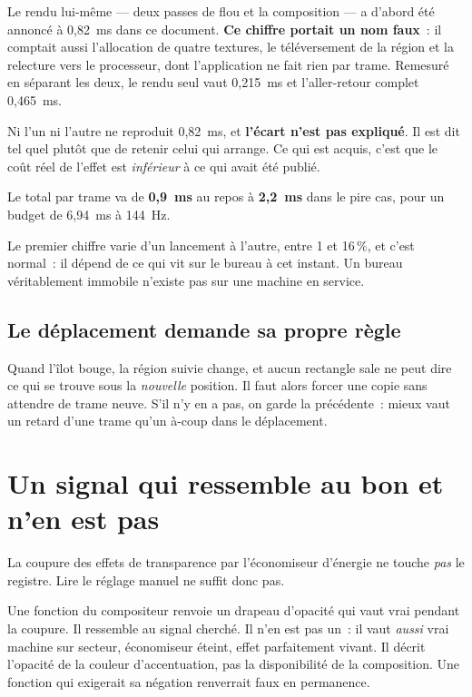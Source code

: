 \documentclass[11pt,a4paper]{article}
\newcommand{\np}[1]{#1}
\begin{document}
Le rendu lui-même — deux passes de flou et la composition — a d'abord été
annoncé à \np{0,82}~ms dans ce document. \textbf{Ce chiffre portait un nom
faux}~: il comptait aussi l'allocation de quatre textures, le téléversement de
la région et la relecture vers le processeur, dont l'application ne fait rien
par trame. Remesuré en séparant les deux, le rendu seul vaut \np{0,215}~ms et
l'aller-retour complet \np{0,465}~ms.

Ni l'un ni l'autre ne reproduit \np{0,82}~ms, et \textbf{l'écart n'est pas
expliqué}. Il est dit tel quel plutôt que de retenir celui qui arrange. Ce qui
est acquis, c'est que le coût réel de l'effet est \emph{inférieur} à ce qui
avait été publié.

Le total par trame va de \textbf{\np{0,9}~ms} au repos à \textbf{\np{2,2}~ms}
dans le pire cas, pour un budget de \np{6,94}~ms à 144~Hz.

Le premier chiffre varie d'un lancement à l'autre, entre 1 et 16\,\%, et c'est
normal~: il dépend de ce qui vit sur le bureau à cet instant. Un bureau
véritablement immobile n'existe pas sur une machine en service.

\subsection{Le déplacement demande sa propre règle}

Quand l'îlot bouge, la région suivie change, et aucun rectangle sale ne peut
dire ce qui se trouve sous la \emph{nouvelle} position. Il faut alors forcer
une copie sans attendre de trame neuve. S'il n'y en a pas, on garde la
précédente~: mieux vaut un retard d'une trame qu'un à-coup dans le
déplacement.

\section{Un signal qui ressemble au bon et n'en est pas}
\label{sec:disponibilite}

La coupure des effets de transparence par l'économiseur d'énergie ne touche
\emph{pas} le registre. Lire le réglage manuel ne suffit donc pas.

Une fonction du compositeur renvoie un drapeau d'opacité qui vaut vrai pendant
la coupure. Il ressemble au signal cherché. Il n'en est pas un~: il vaut
\emph{aussi} vrai machine sur secteur, économiseur éteint, effet parfaitement
vivant. Il décrit l'opacité de la couleur d'accentuation, pas la disponibilité
de la composition. Une fonction qui exigerait sa négation renverrait faux en
permanence.
\end{document}
